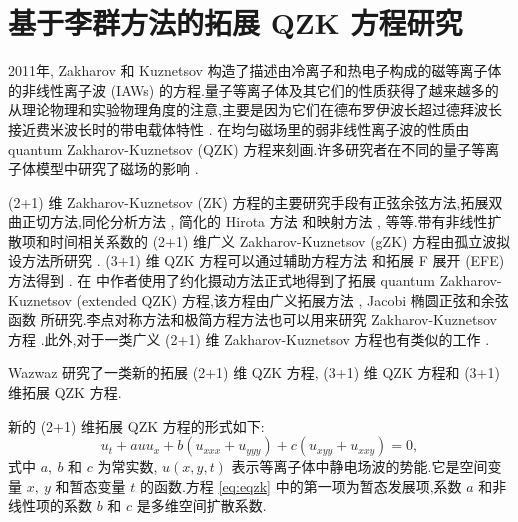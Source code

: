 \chapter{基于李群方法的拓展 QZK 方程研究}

2011年, Zakharov 和 Kuznetsov \cite{abdou2011quant} 构造了描述由冷离子和热电子构成的磁等离子体的非线性离子波 (IAWs) 的方程.量子等离子体及其它们的性质获得了越来越多的从理论物理和实验物理角度的注意,主要是因为它们在德布罗伊波长超过德拜波长接近费米波长时的带电载体特性 \cite{abdou2011quant,ahmed2013kinks,bhrawy2013soli,biswas20091soli,biswas2013soli,bluman2010appli,elganaini2011tra,godleswski2004the,guner2015bright,ibragimov2006inte}. 在均匀磁场里的弱非线性离子波的性质由 quantum Zakharov-Kuznetsov (QZK) 方程来刻画.许多研究者在不同的量子等离子体模型中研究了磁场的影响 \cite{ibragimov2007anew,iwasaki1990cylin,johnpilai2011sym,khan2008linear,krishnan2010sol,leveque1992num,linares2009well,linares2011local,morris2013soli,moslem2007soli,mothibi2015con,moussa2001simi,munro2014con,munro2000sta,mushtaq2005non,olver2000app,peng2008exact,sabry2009non}.

(2+1) 维 Zakharov-Kuznetsov (ZK) 方程的主要研究手段有正弦余弦方法,拓展双曲正切方法,同伦分析方法 \cite{linares2009well}, 简化的 Hirota 方法 \cite{biswas2013soli,bluman2010appli} 和映射方法 \cite{morris2013soli}, 等等.带有非线性扩散项和时间相关系数的 (2+1) 维广义 Zakharov-Kuznetsov (gZK) 方程由孤立波拟设方法所研究 \cite{sabry2009non}. (3+1) 维 QZK 方程可以通过辅助方程方法 \cite{ahmed2013kinks} 和拓展 F 展开 (EFE) 方法得到 \cite{munro2000sta}. 在 \cite{ahmed2013kinks} 中作者使用了约化摄动方法正式地得到了拓展 quantum Zakharov-Kuznetsov (extended QZK) 方程,该方程由广义拓展方法 \cite{guner2015bright}, Jacobi 椭圆正弦和余弦函数 \cite{biswas20091soli} 所研究.李点对称方法和极简方程方法也可以用来研究 Zakharov-Kuznetsov 方程 \cite{leveque1992num}.此外,对于一类广义 (2+1) 维 Zakharov-Kuznetsov 方程也有类似的工作 \cite{moslem2007soli}.

Wazwaz \cite{elganaini2011tra} 研究了一类新的拓展 (2+1) 维 QZK 方程, (3+1) 维 QZK 方程和 (3+1) 维拓展 QZK 方程.

新的 (2+1) 维拓展 QZK 方程的形式如下:
\begin{equation}\label{eq:eqzk}
u_{t}+auu_{x}+b(u_{xxx}+u_{yyy})+c(u_{xyy}+u_{xxy})=0,
\end{equation}
式中 $a,~b$ 和 $c$ 为常实数, $u(x, y, t)$ 表示等离子体中静电场波的势能.它是空间变量 $x,~y$ 和暂态变量 $t$ 的函数.方程 \eqref{eq:eqzk} 中的第一项为暂态发展项,系数 $a$ 和非线性项的系数 $b$ 和 $c$ 是多维空间扩散系数.

